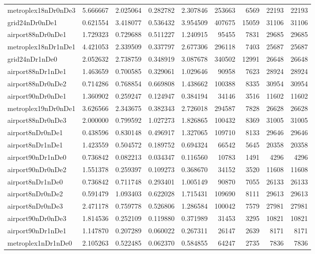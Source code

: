 \documentclass[../../../thesis.tex]{subfiles}
\begin{document}
\begin{longtable}{|l|r|r|r|r|r|r|r|r|}
metroplex18nDr0nDe3 & 5.666667 & 2.025064 & 0.282782 & 2.307846 & 253663 & 6569 & 22193 & 22193 \\
grid24nDr0nDe1 & 0.621554 & 3.418077 & 0.536432 & 3.954509 & 407675 & 15059 & 31106 & 31106 \\
airport88nDr0nDe1 & 1.729323 & 0.729688 & 0.511227 & 1.240915 & 95455 & 7831 & 29685 & 29685 \\
metroplex18nDr1nDe1 & 4.421053 & 2.339509 & 0.337797 & 2.677306 & 296118 & 7403 & 25687 & 25687 \\
grid24nDr1nDe0 & 2.052632 & 2.738759 & 0.348919 & 3.087678 & 340502 & 12991 & 26648 & 26648 \\
airport88nDr1nDe1 & 1.463659 & 0.700585 & 0.329061 & 1.029646 & 90958 & 7623 & 28924 & 28924 \\
airport88nDr0nDe2 & 0.714286 & 0.768854 & 0.669808 & 1.438662 & 100388 & 8335 & 30954 & 30954 \\
airport90nDr0nDe1 & 1.360902 & 0.259247 & 0.124947 & 0.384194 & 34146 & 3516 & 11602 & 11602 \\
metroplex19nDr0nDe1 & 3.626566 & 2.343675 & 0.382343 & 2.726018 & 294587 & 7828 & 26628 & 26628 \\
airport88nDr0nDe3 & 2.000000 & 0.799592 & 1.027273 & 1.826865 & 100432 & 8369 & 31005 & 31005 \\
airport8nDr0nDe1 & 0.438596 & 0.830148 & 0.496917 & 1.327065 & 109710 & 8133 & 29646 & 29646 \\
airport8nDr1nDe1 & 1.423559 & 0.504572 & 0.189752 & 0.694324 & 66542 & 5645 & 20358 & 20358 \\
airport90nDr1nDe0 & 0.736842 & 0.082213 & 0.034347 & 0.116560 & 10783 & 1491 & 4296 & 4296 \\
airport90nDr0nDe2 & 1.551378 & 0.259397 & 0.109273 & 0.368670 & 34152 & 3520 & 11608 & 11608 \\
airport8nDr1nDe0 & 0.736842 & 0.711748 & 0.293401 & 1.005149 & 90870 & 7055 & 26133 & 26133 \\
airport8nDr0nDe2 & 0.591479 & 1.093403 & 0.622028 & 1.715431 & 109690 & 8111 & 29613 & 29613 \\
airport8nDr0nDe3 & 2.471178 & 0.759778 & 0.526806 & 1.286584 & 100042 & 7579 & 27981 & 27981 \\
airport90nDr0nDe3 & 1.814536 & 0.252109 & 0.119880 & 0.371989 & 31453 & 3295 & 10821 & 10821 \\
airport90nDr1nDe1 & 1.147870 & 0.207289 & 0.060022 & 0.267311 & 26147 & 2639 & 8171 & 8171 \\
metroplex1nDr1nDe0 & 2.105263 & 0.522485 & 0.062370 & 0.584855 & 64247 & 2735 & 7836 & 7836 \\

\end{longtable}
\end{document}
